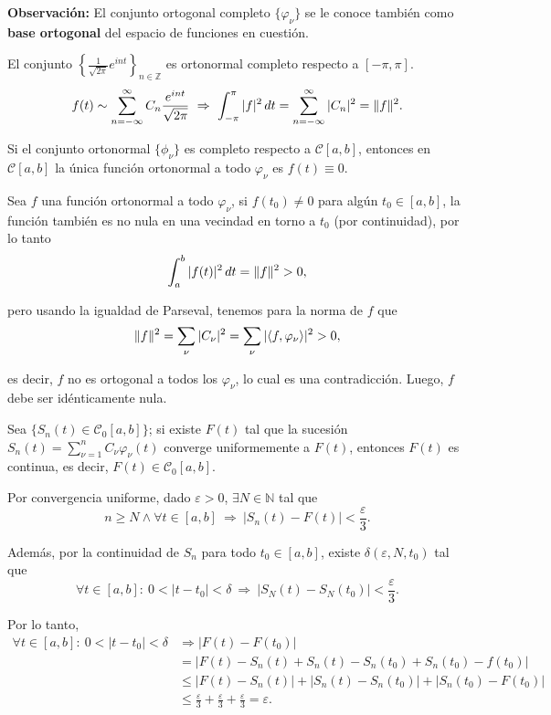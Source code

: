 \textbf{Observación:} El conjunto ortogonal completo $\{\varphi_{\nu}\}$ se le conoce también como \textbf{base ortogonal} del espacio de funciones en cuestión.

\begin{ejemplo}
El conjunto $\left\{ \frac{1}{\sqrt{2 \pi}} e^{i n t} \right\}_{n \in \mathbb{Z}}$ es ortonormal completo respecto a $[-\pi,\pi]$.
$$f(t) \sim \sum_{n = - \infty}^{\infty} C_n \frac{e^{int}}{\sqrt{2\pi}} ~\Rightarrow~ \int_{-\pi}^{\pi} |f|^2 \,dt = \sum_{n=- \infty}^{\infty} |C_n|^2 = \lVert f\rVert^2 .$$
\end{ejemplo}


\begin{teorema}{}{} 
Si el conjunto ortonormal $\{\phi_{\nu}\}$ es completo respecto a $\mathcal{C}[a,b]$, entonces en $\mathcal{C}[a,b]$ la única función ortonormal a todo $\varphi_{\nu}$ es $f(t) \equiv 0$.
\end{teorema}

\begin{demo}
Sea $f$ una función ortonormal a todo $\varphi_{\nu}$, si $f(t_0) \neq 0$ para algún $t_0 \in [a,b]$, la función también es no nula en una vecindad en torno a $t_0$ (por continuidad), por lo tanto 
$$\int_a^b |f(t)|^2 \,dt = \lVert f\rVert^2  > 0,$$

pero usando la igualdad de Parseval, tenemos para la norma de $f$ que
$$\lVert f\rVert^2  = \sum_{\nu} |C_{\nu}|^2 = \sum_{\nu} |\langle f ,\varphi_{\nu} \rangle|^2 > 0,$$

es decir, $f$ no es ortogonal a todos los $\varphi_{\nu}$, lo cual es una contradicción. Luego, $f$ debe ser idénticamente nula.
\end{demo}

\begin{teorema}
Sea $\{S_n(t) \in \mathcal{C}_0[a,b]\}$; si existe $F(t)$ tal que la sucesión $S_n(t) = \sum\limits_{\nu = 1}^n C_{\nu} \varphi_{\nu}(t)$ converge uniformemente a $F(t)$, entonces $F(t)$ es continua, es decir, $F(t) \in \mathcal{C}_0[a,b]$.
\end{teorema}

\begin{demo}
Por convergencia uniforme, dado $\varepsilon > 0$, $\exists N \in \mathbb{N}$ tal que
$$n \geq N \wedge \forall t \in [a,b] ~\Rightarrow~ |S_n(t) - F(t)| < \frac{\varepsilon}{3}.$$

Además, por la continuidad de $S_n$ para todo $t_0 \in [a,b]$, existe $\delta(\varepsilon, N, t_0)$ tal que
$$\forall t \in [a,b]: ~ 0 < |t-t_0| < \delta ~\Rightarrow~ |S_N(t) - S_N(t_0)| < \frac{\varepsilon}{3}.$$

Por lo tanto, 
\begin{align*}
 \forall t \in [a,b]: ~ 0 < |t-t_0| < \delta &\Rightarrow |F(t) - F(t_0)|  \\
 &= |F(t) - S_n(t) + S_n(t) - S_n(t_0) + S_n(t_0) - f(t_0)| \\
 &\leq |F(t) - S_n(t)| + |S_n(t) - S_n(t_0)| + |S_n(t_0) - F(t_0)| \\
 &\leq \frac{\varepsilon}{3} + \frac{\varepsilon}{3} + \frac{\varepsilon}{3} = \varepsilon .
\end{align*}
\end{demo}

